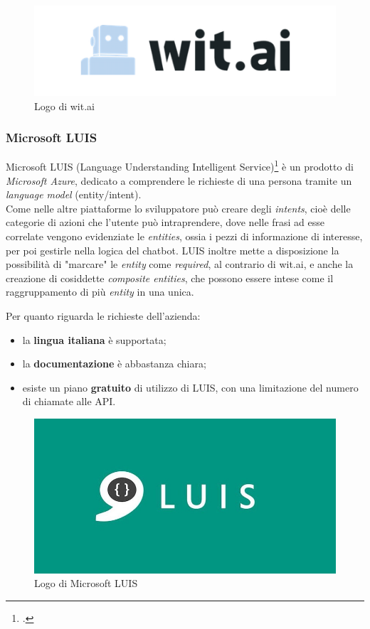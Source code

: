 \begin{figure}[h]
	\centering
	\includegraphics[scale=0.5]{../Immagini/witai.png}
	\caption{Logo di wit.ai}
\end{figure}

\subsubsection{Microsoft LUIS}
Microsoft LUIS (Language Understanding Intelligent Service)\footcite{luis} è un prodotto di \emph{Microsoft Azure}, dedicato a comprendere le richieste di una persona tramite un \emph{language model} (entity/intent). \\
Come nelle altre piattaforme lo sviluppatore può creare degli \emph{intents}, cioè delle categorie di azioni che l'utente può intraprendere, dove nelle frasi ad esse correlate vengono evidenziate le \emph{entities}, ossia i pezzi di informazione di interesse, per poi gestirle nella logica del \gls{chatbot}. LUIS inoltre mette a disposizione la possibilità di "marcare" le \emph{entity} come \emph{required}, al contrario di wit.ai, e anche la creazione di cosiddette \emph{composite entities}, che possono essere intese come il raggruppamento di più \emph{entity} in una unica.

Per quanto riguarda le richieste dell'azienda:
\begin{itemize}
	\item la \textbf{lingua italiana} è supportata;
	\item la \textbf{documentazione} è abbastanza chiara;
	\item esiste un piano \textbf{gratuito} di utilizzo di LUIS, con una limitazione del numero di chiamate alle API.
\end{itemize}

\begin{figure}[h]
	\centering
	\includegraphics[scale=0.25]{../Immagini/luis.jpg}
	\caption{Logo di Microsoft LUIS}
\end{figure}

